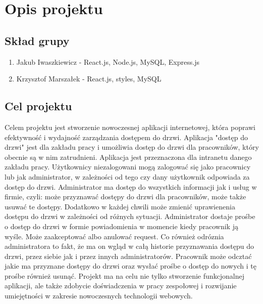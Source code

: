 \section{Opis projektu}
\subsection{Skład grupy}
\begin{enumerate}
    \item Jakub Iwaszkiewicz - React.js, Node.js, MySQL, Express.js
    \item Krzysztof Marszałek - React.js, styles, MySQL
\end{enumerate}

\subsection{Cel projektu}
\noindent Celem projektu jest stworzenie nowoczesnej 
aplikacji internetowej, która poprawi efektywność i wydajność 
zarządzania dostępem do drzwi. Aplikacja "dostęp do drzwi" jest dla zakładu 
pracy i umożliwia dostęp do drzwi dla pracowników, który obecnie są w nim zatrudnieni. 
Aplikacja jest przeznaczona dla intranetu danego zakładu pracy. Użytkownicy niezalogowani 
mogą zalogować się jako pracownicy lub jak administrator, w zależności od tego czy dany 
użytkownik odpowiada za dostęp do drzwi. Administrator ma dostęp do wszystkich informacji 
jak i usług w firmie, czyli: może przyznawać dostępy do drzwi dla pracowników, może także 
usuwać te dostępy. Dodatkowo w każdej chwili może zmienić uprawienenia dostępu do drzwi w 
zależności od różnych sytuacji. Administrator dostaje prośbe o dostęp do drzwi w formie 
powiadomienia w momencie kiedy pracownik ją wyśle. Może zaakceptować albo anulować request. 
Co również odróznia administratora to fakt, że ma on wgląd w całą historie przyznawania 
dostępu do drzwi, przez siebie jak i przez innych administratorów. Pracownik może odcztać
 jakie ma przyznane dostępy do drzwi oraz wysłać prośbe o dostęp do nowych i tę prośbe 
 również usunąć. Projekt ma na celu nie tylko stworzenie funkcjonalnej 
 aplikacji, ale także zdobycie doświadczenia w pracy zespołowej i rozwijanie 
 umiejętności w zakresie nowoczesnych technologii webowych.

